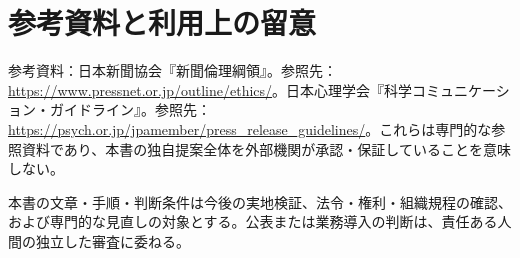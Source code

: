 \documentclass[a4paper,11pt]{article}
\begin{document}
\section{参考資料と利用上の留意}
\par 参考資料：日本新聞協会『新聞倫理綱領』。参照先：\url{https://www.pressnet.or.jp/outline/ethics/}。日本心理学会『科学コミュニケーション・ガイドライン』。参照先：\url{https://psych.or.jp/jpamember/press_release_guidelines/}。これらは専門的な参照資料であり、本書の独自提案全体を外部機関が承認・保証していることを意味しない。\par\medskip
\par 本書の文章・手順・判断条件は今後の実地検証、法令・権利・組織規程の確認、および専門的な見直しの対象とする。公表または業務導入の判断は、責任ある人間の独立した審査に委ねる。\par\medskip
\end{document}
